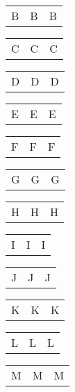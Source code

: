 \documentclass{minimal}
\begin{document}
\begin{longtable}{p{2.8cm}p{2.8cm}p{2.8cm}}
B & B & B
\end{longtable}

\begin{longtable}{p{2.8cm}p{2.8cm}p{2.8cm}}
C & C & C
\end{longtable}

\begin{longtable}{p{2.8cm}p{2.8cm}p{2.8cm}}
D & D & D
\end{longtable}

\begin{longtable}{p{2.8cm}p{2.8cm}p{2.8cm}}
E & E & E
\end{longtable}

\begin{longtable}{p{2.8cm}p{2.8cm}p{2.8cm}}
F & F & F
\end{longtable}

\begin{longtable}{p{2.8cm}p{2.8cm}p{2.8cm}}
G & G & G
\end{longtable}

\begin{longtable}{p{2.8cm}p{2.8cm}p{2.8cm}}
H & H & H
\end{longtable}

\begin{longtable}{p{2.8cm}p{2.8cm}p{2.8cm}}
I & I & I
\end{longtable}

\begin{longtable}{p{2.8cm}p{2.8cm}p{2.8cm}}
J & J & J
\end{longtable}

\begin{longtable}{p{2.8cm}p{2.8cm}p{2.8cm}}
K & K & K
\end{longtable}

\begin{longtable}{p{2.8cm}p{2.8cm}p{2.8cm}}
L & L & L
\end{longtable}

\begin{longtable}{p{2.8cm}p{2.8cm}p{2.8cm}}
M & M & M
\end{longtable}
\end{document}
